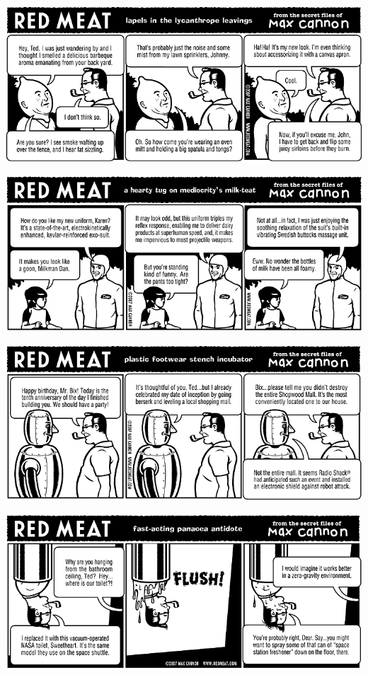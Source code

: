 \documentclass[a4paper,twoside,11pt]{article}
\begin{document}
\includegraphics[width=\textwidth]{redmeat_2007-06-05.png}



\includegraphics[width=\textwidth]{redmeat_2007-06-12.png}



\includegraphics[width=\textwidth]{redmeat_2007-06-19.png}



\includegraphics[width=\textwidth]{redmeat_2007-06-26.png}
\end{document}
